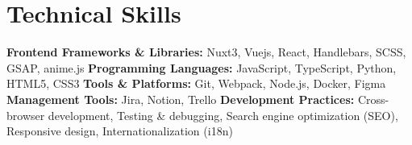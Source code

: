\section*{Technical Skills}
%
%
%
\begin{tasks}
  \task \textbf{Frontend Frameworks \& Libraries:} Nuxt3, Vuejs, React, Handlebars, SCSS, GSAP, anime.js
  \task \textbf{Programming Languages:} JavaScript, TypeScript, Python, HTML5, CSS3
  \task \textbf{Tools \& Platforms:} Git, Webpack, Node.js, Docker, Figma
  \task \textbf{Management Tools:} Jira, Notion, Trello
  \task \textbf{Development Practices:} Cross-browser development, Testing \& debugging, Search engine optimization (SEO), \\Responsive design, Internationalization (i18n)
\end{tasks}